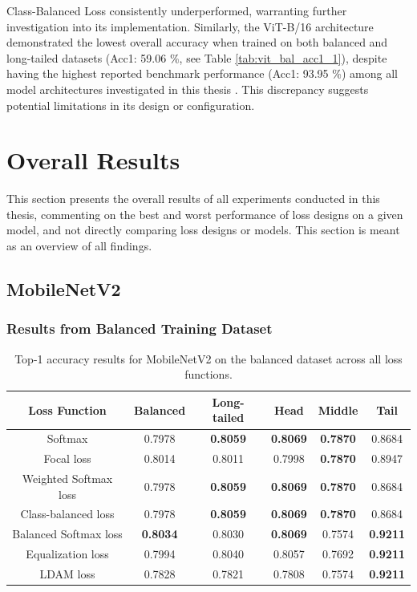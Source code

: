 Class-Balanced Loss consistently underperformed, warranting further investigation into its implementation. Similarly, the ViT-B/16 architecture demonstrated the lowest overall accuracy when trained on both balanced and long-tailed datasets (Acc1: 59.06 \%, see Table \ref{tab:vit_bal_acc1_1}), despite having the highest reported benchmark performance (Acc1: 93.95 \%) among all model architectures investigated in this thesis \cite{Tseng_2022}. This discrepancy suggests potential limitations in its design or configuration.


\section{Overall Results}
This section presents the overall results of all experiments conducted in this thesis, commenting on the best and worst performance of loss designs on a given model, and not directly comparing loss designs or models. This section is meant as an overview of all findings.

\subsection{MobileNetV2}

\subsubsection{Results from Balanced Training Dataset}

\begin{table}[H]
    \centering
    \caption{Top-1 accuracy results for MobileNetV2 on the balanced dataset across all loss functions.}
    \begin{tabular}{cccccc}
        \toprule
        Loss Function & Balanced & Long-tailed & Head & Middle & Tail \\ 
        \midrule
        Softmax   & 0.7978   & \textbf{0.8059} & \textbf{0.8069} & \textbf{0.7870} & 0.8684 \\
        Focal loss   & 0.8014   & 0.8011 & 0.7998 & \textbf{0.7870} & 0.8947 \\
        Weighted Softmax loss   & 0.7978   & \textbf{0.8059} & \textbf{0.8069} & \textbf{0.7870} & 0.8684 \\
        Class-balanced loss   & 0.7978   & \textbf{0.8059} & \textbf{0.8069} & \textbf{0.7870} & 0.8684 \\
        Balanced Softmax loss   & \textbf{0.8034}  & 0.8030 & \textbf{0.8069} & 0.7574 & \textbf{0.9211} \\
        Equalization loss   & 0.7994   & 0.8040 & 0.8057 & 0.7692 & \textbf{0.9211} \\
        LDAM loss   &  0.7828   & 0.7821 & 0.7808 & 0.7574 & \textbf{0.9211} \\
        \bottomrule
    \end{tabular}
    \label{tab:mobilenet_bal_acc1_1}
\end{table}

